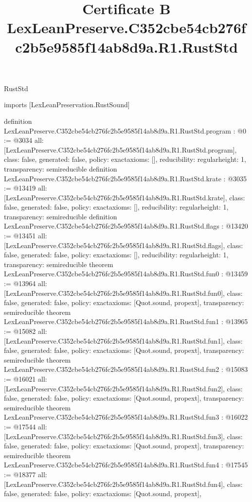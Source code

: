 \begin{lexlean}{RustStd}
\title{Certificate B LexLeanPreserve.C352cbe54cb276fc2b5e9585f14ab8d9a.R1.RustStd}
\begin{coremodule}
imports [LexLeanPreservation.RustSound]

definition LexLeanPreserve.C352cbe54cb276fc2b5e9585f14ab8d9a.R1.RustStd.program : @0 := @3034 {
  all: [LexLeanPreserve.C352cbe54cb276fc2b5e9585f14ab8d9a.R1.RustStd.program],
  class: false,
  generated: false,
  policy: exact{axioms: []},
  reducibility: regular{height: 1},
  transparency: semireducible
}
definition LexLeanPreserve.C352cbe54cb276fc2b5e9585f14ab8d9a.R1.RustStd.krate : @3035 := @13419 {
  all: [LexLeanPreserve.C352cbe54cb276fc2b5e9585f14ab8d9a.R1.RustStd.krate],
  class: false,
  generated: false,
  policy: exact{axioms: []},
  reducibility: regular{height: 1},
  transparency: semireducible
}
definition LexLeanPreserve.C352cbe54cb276fc2b5e9585f14ab8d9a.R1.RustStd.flags : @13420 := @13451 {
  all: [LexLeanPreserve.C352cbe54cb276fc2b5e9585f14ab8d9a.R1.RustStd.flags],
  class: false,
  generated: false,
  policy: exact{axioms: []},
  reducibility: regular{height: 1},
  transparency: semireducible
}
theorem LexLeanPreserve.C352cbe54cb276fc2b5e9585f14ab8d9a.R1.RustStd.fun0 : @13459 := @13964 {
  all: [LexLeanPreserve.C352cbe54cb276fc2b5e9585f14ab8d9a.R1.RustStd.fun0],
  class: false,
  generated: false,
  policy: exact{axioms: [Quot.sound, propext]},
  transparency: semireducible
}
theorem LexLeanPreserve.C352cbe54cb276fc2b5e9585f14ab8d9a.R1.RustStd.fun1 : @13965 := @15082 {
  all: [LexLeanPreserve.C352cbe54cb276fc2b5e9585f14ab8d9a.R1.RustStd.fun1],
  class: false,
  generated: false,
  policy: exact{axioms: [Quot.sound, propext]},
  transparency: semireducible
}
theorem LexLeanPreserve.C352cbe54cb276fc2b5e9585f14ab8d9a.R1.RustStd.fun2 : @15083 := @16021 {
  all: [LexLeanPreserve.C352cbe54cb276fc2b5e9585f14ab8d9a.R1.RustStd.fun2],
  class: false,
  generated: false,
  policy: exact{axioms: [Quot.sound, propext]},
  transparency: semireducible
}
theorem LexLeanPreserve.C352cbe54cb276fc2b5e9585f14ab8d9a.R1.RustStd.fun3 : @16022 := @17544 {
  all: [LexLeanPreserve.C352cbe54cb276fc2b5e9585f14ab8d9a.R1.RustStd.fun3],
  class: false,
  generated: false,
  policy: exact{axioms: [Quot.sound, propext]},
  transparency: semireducible
}
theorem LexLeanPreserve.C352cbe54cb276fc2b5e9585f14ab8d9a.R1.RustStd.fun4 : @17545 := @18377 {
  all: [LexLeanPreserve.C352cbe54cb276fc2b5e9585f14ab8d9a.R1.RustStd.fun4],
  class: false,
  generated: false,
  policy: exact{axioms: [Quot.sound, propext]},
}
\end{coremodule}
\end{lexlean}
